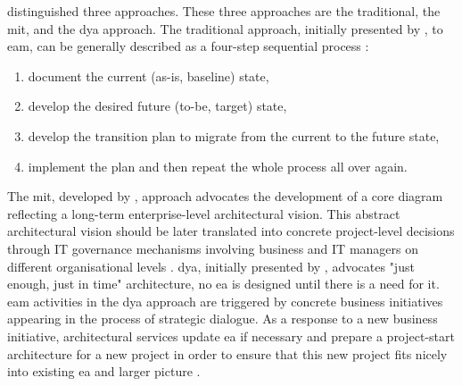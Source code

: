 \textcite{Kotusev2015} distinguished three approaches. These three approaches are the traditional, the \acrfull{mit}, and the \acrfull{dya} approach. The traditional approach, initially presented by \textcite{Spewak1993}, to \acrfull{eam}, can be generally described as a four-step sequential process \parencite[p.~4071]{Kotusev2015}:
\begin{enumerate}
	\item{document the current (as-is, baseline) state,}
	\item{develop the desired future (to-be, target) state,}
	\item{develop the transition plan to migrate from the current to the future state,}
	\item{implement the plan and then repeat the whole process all over again.}
\end{enumerate}
The \acrshort{mit}, developed by \textcite{Ross2014}, approach advocates the development of a core diagram reflecting a long-term enterprise-level architectural vision. This abstract architectural vision should be later translated into concrete project-level decisions through IT governance mechanisms involving business and IT managers on different organisational levels \parencite[p.~4072]{Kotusev2015}. \acrfull{dya}, initially presented by \textcite{Wagter2005}, advocates "just enough, just in time" architecture, no \acrshort{ea} is designed until there is a need for it. \acrshort{eam} activities in the \acrshort{dya} approach are triggered by concrete business initiatives appearing in the process of strategic dialogue. As a response to a new business initiative, architectural services update \acrshort{ea} if necessary and prepare a project-start architecture for a new project in order to ensure that this new project fits nicely into existing \acrshort{ea} and larger picture \parencite[p.~4072]{Kotusev2015}. 

